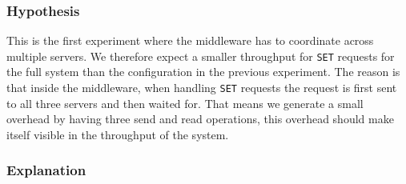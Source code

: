 \documentclass[11pt,a4paper]{article}
\begin{document}
\subsubsection{Hypothesis}
%
This is the first experiment where the middleware has to coordinate across multiple servers.
%
We therefore expect a smaller throughput for \texttt{SET} requests for the full system than the configuration in the previous experiment.
%
The reason is that inside the middleware, when handling \texttt{SET} requests the request is first sent to all three servers and then waited for.
%
That means we generate a small overhead by having three send and read operations, this overhead should make itself visible in the throughput of the system.
%
\subsubsection{Explanation}
%
\end{document}
